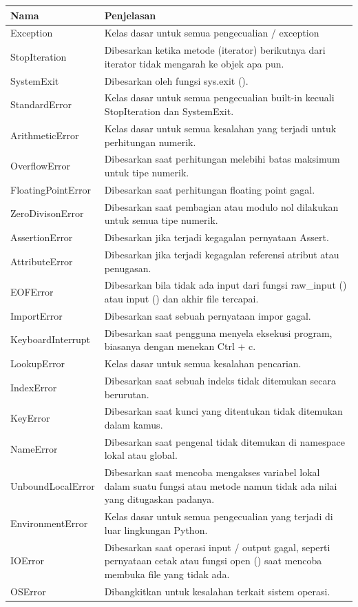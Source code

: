 \begin{center}
\begin{tabular}{ | m{3cm} | m{7cm} | }
\hline
Nama & Penjelasan \\
\hline
Exception & Kelas dasar untuk semua pengecualian / exception \\
\hline
StopIteration & Dibesarkan ketika metode (iterator) berikutnya dari iterator tidak mengarah ke objek apa pun. \\
\hline
SystemExit & Dibesarkan oleh fungsi sys.exit (). \\
\hline
StandardError & Kelas dasar untuk semua pengecualian built-in kecuali StopIteration dan SystemExit. \\
\hline
ArithmeticError & Kelas dasar untuk semua kesalahan yang terjadi untuk perhitungan numerik. \\
\hline
OverflowError & Dibesarkan saat perhitungan melebihi batas maksimum untuk tipe numerik. \\
\hline
FloatingPointError & Dibesarkan saat perhitungan floating point gagal. \\
\hline
ZeroDivisonError & Dibesarkan saat pembagian atau modulo nol dilakukan untuk semua tipe numerik. \\
\hline
AssertionError & Dibesarkan jika terjadi kegagalan pernyataan Assert. \\
\hline
AttributeError & Dibesarkan jika terjadi kegagalan referensi atribut atau penugasan. \\
\hline
EOFError & Dibesarkan bila tidak ada input dari fungsi raw\_input () atau input () dan akhir file tercapai. \\
\hline
ImportError & Dibesarkan saat sebuah pernyataan impor gagal. \\
\hline
KeyboardInterrupt & Dibesarkan saat pengguna menyela eksekusi program, biasanya dengan menekan Ctrl + c. \\
\hline
LookupError & Kelas dasar untuk semua kesalahan pencarian. \\
\hline
IndexError & Dibesarkan saat sebuah indeks tidak ditemukan secara berurutan. \\
\hline
KeyError & Dibesarkan saat kunci yang ditentukan tidak ditemukan dalam kamus. \\
\hline
NameError & Dibesarkan saat pengenal tidak ditemukan di namespace lokal atau global. \\
\hline
UnboundLocalError & Dibesarkan saat mencoba mengakses variabel lokal dalam suatu fungsi atau metode namun tidak ada nilai yang ditugaskan padanya. \\
\hline
EnvironmentError & Kelas dasar untuk semua pengecualian yang terjadi di luar lingkungan Python. \\
\hline
IOError & Dibesarkan saat operasi input / output gagal, seperti pernyataan cetak atau fungsi open () saat mencoba membuka file yang tidak ada. \\
\hline
OSError & Dibangkitkan untuk kesalahan terkait sistem operasi. \\
\hline
\end{tabular}
\end{center}

